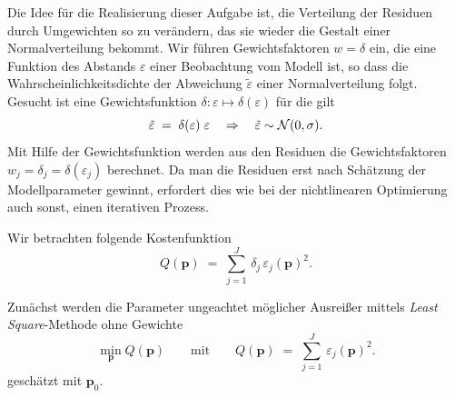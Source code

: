 Die Idee für die Realisierung dieser Aufgabe ist, die Verteilung der Residuen durch Umgewichten so zu verändern, das
sie wieder die Gestalt einer Normalverteilung bekommt. Wir führen Gewichtsfaktoren $w = \delta$ ein,
die eine Funktion des Abstands $\varepsilon$ einer Beobachtung vom Modell ist, so dass die Wahrscheinlichkeitsdichte 
der Abweichung $\tilde \varepsilon$ einer Normalverteilung folgt. Gesucht ist eine Gewichtsfunktion
$\delta \! : \varepsilon \mapsto \delta(\varepsilon)$ für die gilt
\begin{equation}
\tilde \varepsilon \; = \; \delta(\varepsilon) \; \varepsilon \quad \Rightarrow
\quad \tilde \varepsilon \sim {\cal N}(0,\sigma) .
\end{equation}
Mit Hilfe der Gewichtsfunktion werden aus den Residuen die Gewichtsfaktoren
$w_j = \delta_j = \delta(\varepsilon_j)$ berechnet. Da man die Residuen erst nach
Schätzung der Modellparameter gewinnt, erfordert dies wie bei der nichtlinearen Optimierung
auch sonst, einen iterativen Prozess.

Wir betrachten folgende Kostenfunktion
\begin{equation}
Q(\mathbf{p}) \; = \; \sum_{j=1}^J \, \delta_j \, \varepsilon_j(\mathbf{p})^2 .
\label{robustEstim}
\end{equation}

Zunächst werden die Parameter ungeachtet möglicher Ausreißer mittels \textsl{Least Square}-Methode
ohne Gewichte
\begin{equation}
 \min_{\mathbf{p}} Q(\mathbf{p}) \qquad \mathrm{mit} \qquad 
Q(\mathbf{p}) \; = \; \sum_{j=1}^J \, \varepsilon_j(\mathbf{p})^2 .
\label{linEstim}
\end{equation}
geschätzt mit $\mathbf{p}_0$.

